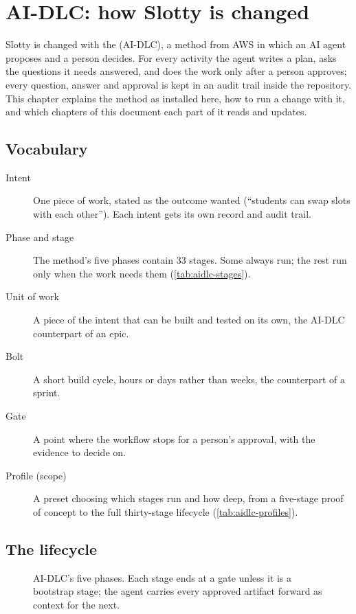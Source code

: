 \chapter{AI-DLC: how Slotty is changed}\label{ch:aidlc}

Slotty is changed with the  (AI-DLC), a method from AWS
in which an AI agent proposes and a person decides. For every activity the agent writes a plan,
asks the questions it needs answered, and does the work only after a person approves; every
question, answer and approval is kept in an audit trail inside the repository. This chapter
explains the method as installed here, how to run a change with it, and which chapters of this
document each part of it reads and updates.

\section{Vocabulary}
\begin{description}
  \item[Intent] One piece of work, stated as the outcome wanted (\enquote{students can swap slots
    with each other}). Each intent gets its own record and audit trail.
  \item[Phase and stage] The method's five phases contain 33 stages. Some always run; the rest run
    only when the work needs them (\cref{tab:aidlc-stages}).
  \item[Unit of work] A piece of the intent that can be built and tested on its own, the AI-DLC
    counterpart of an epic.
  \item[Bolt] A short build cycle, hours or days rather than weeks, the counterpart of a sprint.
  \item[Gate] A point where the workflow stops for a person's approval, with the evidence to
    decide on.
  \item[Profile (scope)] A preset choosing which stages run and how deep, from a five-stage
    proof of concept to the full thirty-stage lifecycle (\cref{tab:aidlc-profiles}).
\end{description}

\section{The lifecycle}
\begin{figure}[htbp]
  \centering
  
  \caption{AI-DLC's five phases. Each stage ends at a gate unless it is a bootstrap stage; the
    agent carries every approved artifact forward as context for the next.}
  \label{fig:aidlc}
\end{figure}

